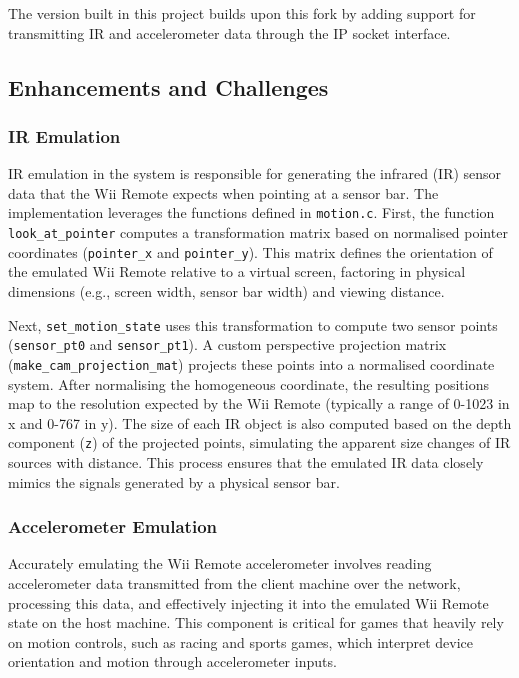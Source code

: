 The version built in this project\cite{kf_wiimote_emu} builds upon this fork by adding support for transmitting IR and accelerometer data through the IP socket interface.

\subsection{Enhancements and Challenges}


\subsubsection{IR Emulation}

IR emulation in the system is responsible for generating the infrared (IR)
sensor data that the Wii Remote expects when pointing at a sensor bar. The
implementation leverages the functions defined in \texttt{motion.c}. First, the
function \texttt{look\_at\_pointer} computes a transformation matrix based on
normalised pointer coordinates (\texttt{pointer\_x} and \texttt{pointer\_y}).
This matrix defines the orientation of the emulated Wii Remote relative to a
virtual screen, factoring in physical dimensions (e.g., screen width, sensor bar
width) and viewing distance.

Next, \texttt{set\_motion\_state} uses this transformation to compute two sensor
points (\texttt{sensor\_pt0} and \texttt{sensor\_pt1}).  A custom perspective projection matrix \linebreak(\texttt{make\_cam\_projection\_mat}) projects these points into a normalised coordinate system. After normalising the homogeneous coordinate, the resulting positions map to
the resolution expected by the Wii Remote (typically a range of 0-1023 in x and
0-767 in y). The size of each IR object is also computed based on the depth
component (\texttt{z}) of the projected points, simulating the apparent size
changes of IR sources with distance. This process ensures that the emulated IR
data closely mimics the signals generated by a physical sensor bar.

\subsubsection{Accelerometer Emulation}

Accurately emulating the Wii Remote accelerometer involves reading accelerometer data transmitted from the client machine over the network, processing this data, and effectively injecting it into the emulated Wii Remote state on the host machine. This component is critical for games that heavily rely on motion controls, such as racing and sports games, which interpret device orientation and motion through accelerometer inputs.

